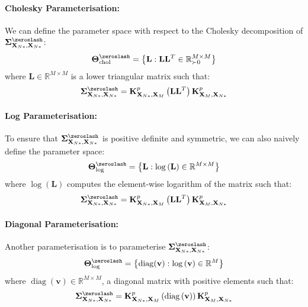 \documentclass{article}
\newcommand{\diag}{\operatorname{diag}}
\numberwithin{equation}{section}
\begin{document}
\paragraph{Cholesky Parameterisation:}We can define the parameter space with respect to the Cholesky decomposition of $\mathbf{\Sigma}^{\zeroslash}_{\mathbf{X}_{N*}, \mathbf{X}_{N*}}$:
\begin{align}
    \boldsymbol{\Theta}^{\zeroslash}_{\text{chol}} = \left\{\mathbf{L}: \mathbf{L} \mathbf{L}^T \in \mathbb{R}^{M\times M}_{\succ 0}\right\}
\end{align}
where $\mathbf{L} \in \mathbb{R}^{M\times M}$ is a lower triangular matrix such that:
\begin{align}
    \mathbf{\Sigma}^{\zeroslash}_{\mathbf{X}_{N*}, \mathbf{X}_{N*}} = \mathbf{K}^p_{\mathbf{X}_{N*}, \mathbf{X}_M} \left(\mathbf{L} \mathbf{L}^T\right)\mathbf{K}^p_{\mathbf{X}_M, \mathbf{X}_{N*}} 
\end{align}

\paragraph{Log Parameterisation:}To ensure that $\mathbf{\Sigma}^{\zeroslash}_{\mathbf{X}_{N*}, \mathbf{X}_{N*}}$ is positive definite and symmetric, we can also naively define the parameter space:
\begin{align}
    \boldsymbol{\Theta}^{\zeroslash}_{\text{log}} = \left\{\mathbf{L}: \log\left(\mathbf{L}\right)  \in \mathbb{R}^{M\times M}\right\}
\end{align}
where $\log\left(\mathbf{L}\right)$ computes the element-wise logarithm of the matrix such that:
\begin{align}
    \mathbf{\Sigma}^{\zeroslash}_{\mathbf{X}_{N*}, \mathbf{X}_{N*}} = \mathbf{K}^p_{\mathbf{X}_{N*}, \mathbf{X}_M} \left(\mathbf{L} \mathbf{L}^T\right)\mathbf{K}^p_{\mathbf{X}_M, \mathbf{X}_{N*}} 
    \label{chol-svgp}
\end{align}

\paragraph{Diagonal Parameterisation:}Another parameterisation is to parameterise $\mathbf{\Sigma}^{\zeroslash}_{\mathbf{X}_{N*}, \mathbf{X}_{N*}}$:
\begin{align}
    \boldsymbol{\Theta}^{\zeroslash}_{\text{log}} = \left\{\diag(\mathbf{v}): \log\left(\mathbf{v}\right)  \in \mathbb{R}^{M}\right\}
    \label{log-svgp}
\end{align}
where $\diag(\mathbf{v}) \in \mathbb{R}^{M\times M}$, a diagonal matrix with positive elements such that:
\begin{align}
    \mathbf{\Sigma}^{\zeroslash}_{\mathbf{X}_{N*}, \mathbf{X}_{N*}} = \mathbf{K}^p_{\mathbf{X}_{N*}, \mathbf{X}_M} \left(\diag\left(\mathbf{v}\right)\right)\mathbf{K}^p_{\mathbf{X}_M, \mathbf{X}_{N*}} 
    \label{diagonal-svgp}
\end{align}
\end{document}

